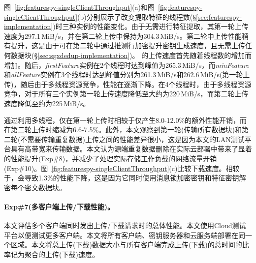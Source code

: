 图~\ref{fig:featurespy-singleClientThroughput}(a)和图~\ref{fig:featurespy-singleClientThroughput}(b)分别展示了改变提取特征的线程数(\S\ref{sec:featurespy-implementation})时\prototype 三种实例的性能变化。由于\sysnameS 无需进行特征提取，其第一轮上传速度为297.1\,MiB/s，并在第二轮上传中保持为304.3\,MiB/s。第二轮中上传性能稍有提升，这是由于\sysnameS 可在第二轮中通过推测行加密提升密钥生成速度，且无需上传任何数据块(\S\ref{sec:sgxdedup-implementation})。
\prototype 的上传速度首先随着线程数的增加而增加。随后，\textit{firstFeature}实例在2个线程时达到峰值为265.3\,MiB/s，而\textit{minFeature}和\textit{allFeature}实例在3个线程时达到峰值分别为261.3\,MiB/s和262.6\,MiB/s(第一轮上传)，随后由于多线程资源竞争，性能在逐渐下降。在4个线程时，由于多线程资源竞争，对于所有三个实例第一轮上传速度降低至大约为220\,MiB/s，而第二轮上传速度降低至约为225\,MiB/s。

通过利用多线程，\prototype 仅在第一轮上传时相较于\sysnameS 仅产生8.0-12.0\%的额外性能开销，而在第二轮上传时缩减为6.6-7.5\%。此外，本文观察到第一轮(传输所有数据块)和第二轮(不需要传输重复数据)上传之间的性能差异很小，这是因为本文的LAN测试平台具有高带宽来传输数据。本文认为源端重复数据删除在实际云部署中带来了显着的性能提升(Exp\#8)，并减少了处理实际存储工作负载的网络流量开销(Exp\#10)。图~\ref{fig:featurespy-singleClientThroughput}(c)比较下载速度。相较于\sysnameS，\prototype 会导致1.3\%的性能下降，这是因为它同时使用消息锁加密密钥和特征密钥解密每个密文数据块。

\paragraph*{Exp\#7(多客户端上传/下载性能)。}
本文评估多个客户端同时发出上传/下载请求时的总体性能。本文使用Cloud测试平台以便测试更多客户端。本文将所有客户端、密钥服务器和云服务端部署在同一个区域。本文将总上传(下载)数据大小与所有客户端完成上传(下载)的总时间的比率记为聚合的上传(下载)速度。

